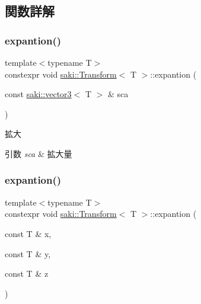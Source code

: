 \subsection{関数詳解}
\mbox{\label{classsaki_1_1_transform_a8327df1cfe852938414010ead1806ce5}} 
\subsubsection{\texorpdfstring{expantion()}{expantion()}\hspace{0.1cm}{\footnotesize\ttfamily [1/2]}}
{\footnotesize\ttfamily template$<$typename T$>$ \\
constexpr void \mbox{\hyperlink{classsaki_1_1_transform}{saki\+::\+Transform}}$<$ T $>$\+::expantion (\begin{DoxyParamCaption}\item[{const \mbox{\hyperlink{classsaki_1_1vector3}{saki\+::vector3}}$<$ T $>$ \&}]{sca }\end{DoxyParamCaption})\hspace{0.3cm}{\ttfamily [inline]}}



拡大 


\begin{DoxyParams}{引数}
{\em sca} & 拡大量 \\
\hline
\end{DoxyParams}
\mbox{\label{classsaki_1_1_transform_a33696821bc9d53d221aaeb6927fe6f64}} 
\subsubsection{\texorpdfstring{expantion()}{expantion()}\hspace{0.1cm}{\footnotesize\ttfamily [2/2]}}
{\footnotesize\ttfamily template$<$typename T$>$ \\
constexpr void \mbox{\hyperlink{classsaki_1_1_transform}{saki\+::\+Transform}}$<$ T $>$\+::expantion (\begin{DoxyParamCaption}\item[{const T \&}]{x,  }\item[{const T \&}]{y,  }\item[{const T \&}]{z }\end{DoxyParamCaption})\hspace{0.3cm}{\ttfamily [inline]}}



